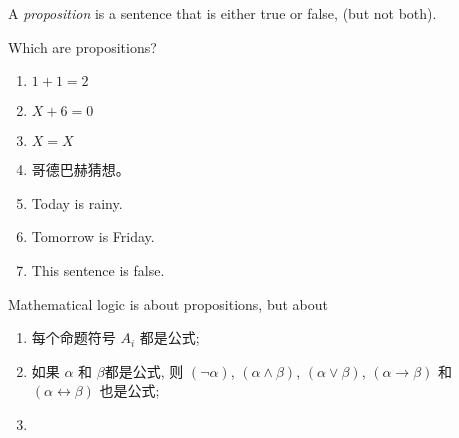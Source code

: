 
\begin{frame}{}
  \begin{definition}[Proposition (命题)]
    A {\it proposition} is a sentence that is either true or false,
    (but not both).
  \end{definition}

  \vspace{0.30cm}
  \pause
  \begin{exampleblock}{Which are propositions?}
    \begin{enumerate}
      \item $1 + 1 = 2$
      \item $X + 6 = 0$
      \item $X = X$
      \item 哥德巴赫猜想。
      \item Today is rainy.
      \item Tomorrow is Friday.
      \item This sentence is false.
    \end{enumerate}
  \end{exampleblock}
\end{frame}

\begin{frame}{}
  \begin{center}

    \vspace{0.50cm}
    Mathematical logic is  about propositions,
    but about 
  \end{center}
\end{frame}

\begin{frame}{}
  \begin{definition}[命题逻辑的语言]
      
  \end{definition}
\end{frame}

\begin{frame}{}
  \begin{definition}[公式 (Formula)]
    \begin{enumerate}[(1)]
      \setlength{\itemsep}{8pt}
      \item 每个命题符号 $A_{i}$ 都是公式;
      \item 如果 $\alpha$ 和 $\beta$都是公式,
        则 $(\lnot \alpha)$, $(\alpha \land \beta)$, $(\alpha \lor \beta)$,
        $(\alpha \to \beta)$ 和 $(\alpha \leftrightarrow \beta)$ 也是公式;
      \item {}
    \end{enumerate}
  \end{definition}

  
\end{frame}

